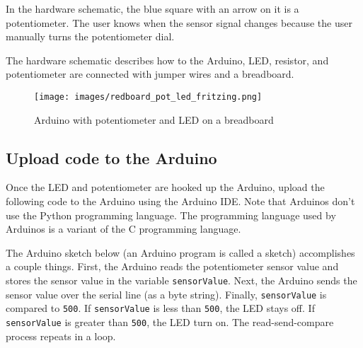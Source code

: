 \documentclass{book}
\makeatletter
\def\maxwidth{\ifdim\Gin@nat@width>\linewidth\linewidth
\else\Gin@nat@width\fi}
\let\Oldincludegraphics\includegraphics
\renewcommand{\includegraphics}[1]{\Oldincludegraphics[width=.8\maxwidth]{#1}}
\newcommand{\passthrough}[1]{#1}
\makeatother
\begin{document}
In the hardware schematic, the blue square with an arrow on it is a
potentiometer. The user knows when the sensor signal changes because the
user manually turns the potentiometer dial.

The hardware schematic describes how to the Arduino, LED, resistor, and
potentiometer are connected with jumper wires and a breadboard.
    




    
        \begin{figure}
\centering
\texttt{[image: images/redboard\_pot\_led\_fritzing.png]}
\caption{Arduino with potentiometer and LED on a breadboard}
\end{figure}
    




    
        \hypertarget{upload-code-to-the-arduino}{%
\subsection{Upload code to the
Arduino}\label{upload-code-to-the-arduino}}
    




    
        Once the LED and potentiometer are hooked up the Arduino, upload the
following code to the Arduino using the Arduino IDE. Note that Arduinos
don't use the Python programming language. The programming language used
by Arduinos is a variant of the C programming language.

The Arduino sketch below (an Arduino program is called a sketch)
accomplishes a couple things. First, the Arduino reads the potentiometer
sensor value and stores the sensor value in the variable
\passthrough{\lstinline!sensorValue!}. Next, the Arduino sends the
sensor value over the serial line (as a byte string). Finally,
\passthrough{\lstinline!sensorValue!} is compared to
\passthrough{\lstinline!500!}. If \passthrough{\lstinline!sensorValue!}
is less than \passthrough{\lstinline!500!}, the LED stays off. If
\passthrough{\lstinline!sensorValue!} is greater than
\passthrough{\lstinline!500!}, the LED turn on. The read-send-compare
process repeats in a loop.
    
\end{document}
